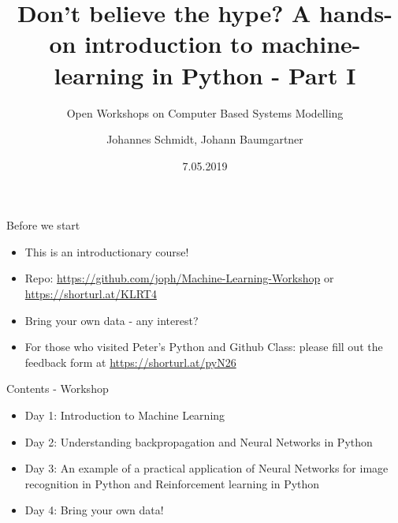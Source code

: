 \documentclass[color=usenames,dvipsnames]{beamer}
\title[Workshop - Machine Learning]{ Don't believe the hype? A hands-on introduction to machine-learning in Python - Part I}
\subtitle{Open Workshops on Computer Based Systems Modelling}
\author{Johannes Schmidt, Johann Baumgartner}
\institute{Institute for Sustainable Economic Development, BOKU, Vienna}
\date{7.05.2019}
\begin{document}
{


\begin{frame}

\maketitle



\end{frame}
}


\begin{frame}{Before we start}

\begin{itemize}
	\item This is an introductionary course!
	\item Repo: \href{https://github.com/joph/Machine-Learning-Workshop}{https://github.com/joph/Machine-Learning-Workshop} or \href{https://shorturl.at/KLRT4}{https://shorturl.at/KLRT4}
	\item Bring your own data - any interest?
	\item For those who visited Peter's Python and Github Class: please fill out the feedback form at \href{https://shorturl.at/pyN26}{https://shorturl.at/pyN26}
\end{itemize}

\end{frame}


\begin{frame}{Contents - Workshop}

\begin{itemize}
\item Day 1: Introduction to Machine Learning
\item Day 2: Understanding backpropagation and Neural Networks in Python
\item Day 3: An example of a practical application of Neural Networks for image recognition in Python and Reinforcement learning in Python
\item Day 4: Bring your own data!
\end{itemize}

\end{frame}
\end{document}
